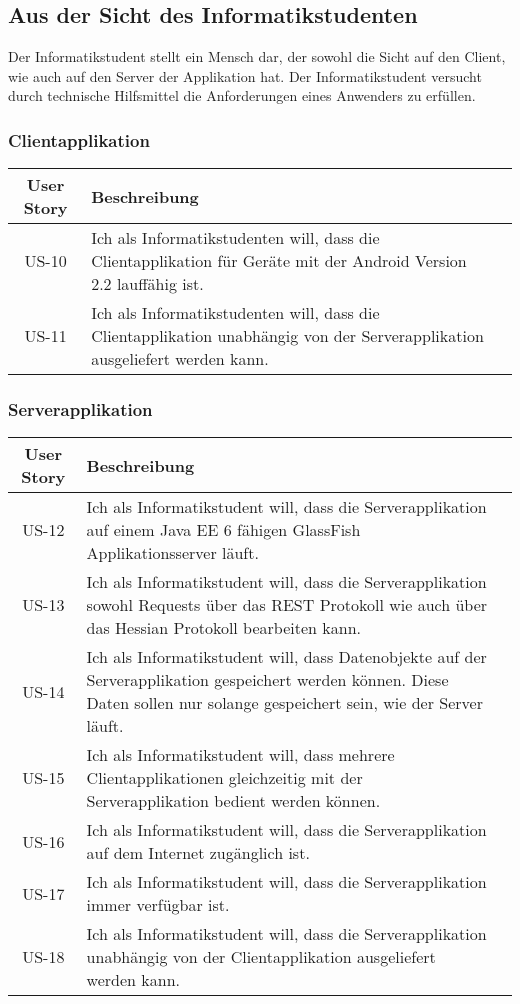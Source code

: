\documentclass[listof=totocnumbered, bibliography=totocnumbered]{scrreprt}
\begin{document}
  \subsection{Aus der Sicht des Informatikstudenten}
  
  Der Informatikstudent stellt ein Mensch dar, der sowohl die Sicht auf den
  Client, wie auch auf den Server der Applikation hat. Der Informatikstudent
  versucht durch technische Hilfsmittel die Anforderungen eines Anwenders zu
  erfüllen.
  
  \subsubsection{Clientapplikation}
  
  \begin{tabular}{cp{13cm}l}
    \toprule
    User Story & Beschreibung \\
    \midrule
    US-10 & Ich als Informatikstudenten will, dass die Clientapplikation für
    Geräte mit der Android Version 2.2 lauffähig ist. \\
    US-11 & Ich als Informatikstudenten will, dass die Clientapplikation
    unabhängig von der Serverapplikation ausgeliefert werden kann. \\
    \bottomrule
  \end{tabular}
  
  \subsubsection{Serverapplikation}
  
  \begin{tabular}{cp{13cm}l}
    \toprule
    User Story & Beschreibung \\
    \midrule
    US-12 & Ich als Informatikstudent will, dass die Serverapplikation auf
    einem Java EE 6 fähigen GlassFish Applikationsserver läuft. \\
    US-13 & Ich als Informatikstudent will, dass die Serverapplikation sowohl
    Requests über das \ac{REST} Protokoll wie auch über das Hessian
    Protokoll bearbeiten kann. \\
    US-14 & Ich als Informatikstudent will, dass Datenobjekte auf der
    Serverapplikation gespeichert werden können. Diese Daten sollen nur solange
    gespeichert sein, wie der Server läuft. \\
    US-15 & Ich als Informatikstudent will, dass mehrere Clientapplikationen
    gleichzeitig mit der Serverapplikation bedient werden können. \\
    US-16 & Ich als Informatikstudent will, dass die Serverapplikation
    auf dem Internet zugänglich ist. \\
    US-17 & Ich als Informatikstudent will, dass die Serverapplikation immer
    verfügbar ist. \\
    US-18 & Ich als Informatikstudent will, dass die Serverapplikation
    unabhängig von der Clientapplikation ausgeliefert werden kann. \\
    \bottomrule
  \end{tabular}
  
\end{document}
